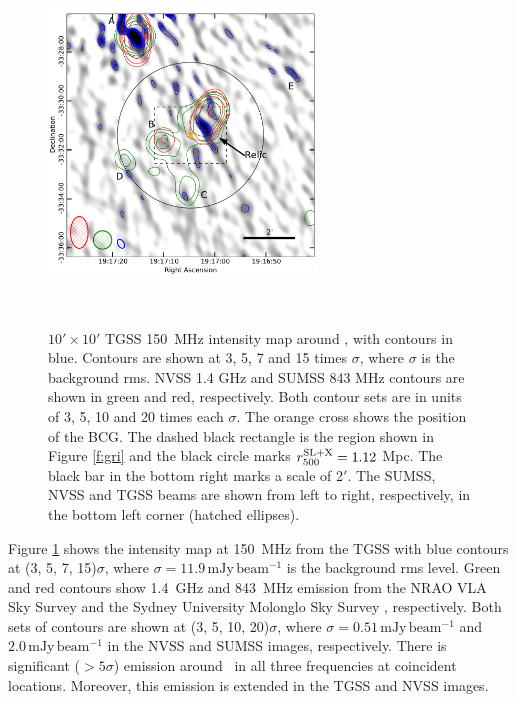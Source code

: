 \begin{figure}
 \begin{minipage}[b]{2.8in}
   \mbox{}\\[-\baselineskip]
  \includegraphics[width=2.8in]{chapter2/radioimg.pdf}
 \end{minipage}\hfill
 \begin{minipage}[b]{2in}
   \mbox{}\\[-\baselineskip]
   \caption{$10'\times10'$ TGSS 150~MHz intensity map around \plck, with contours in blue. 
Contours are shown at 3, 5, 7 and 15 times $\sigma$, where $\sigma$ is the background rms. NVSS 
1.4 GHz and SUMSS 843 MHz contours are shown in green and red, respectively. Both contour sets are 
in units of 3, 5, 10 and 20 times each $\sigma$. The orange cross shows the position of the 
BCG. The dashed black rectangle is the region shown in Figure \ref{f:gri} and the black circle 
marks $r_{500}^{\rm SL+X}=1.12$ Mpc. The black bar in the bottom right marks a scale of 2$'$. The
SUMSS, NVSS and TGSS beams are shown from left to right, respectively, in the bottom left corner 
(hatched ellipses).}
\label{f:radio}
 \end{minipage}
\end{figure}


Figure \ref{f:radio} shows the intensity map at 150~MHz from the TGSS with blue contours at
(3, 5, 7, 15)$\sigma$, where $\sigma=11.9\,\mathrm{mJy\,beam^{-1}}$ is the background 
rms level. Green and red contours show 1.4~GHz and 843~MHz emission from the NRAO VLA Sky Survey 
\citep[NVSS;][]{condon98} and the Sydney University Molonglo Sky Survey 
\citep[SUMSS;][]{mauch03}, 
respectively. Both sets of contours are shown at (3, 5, 10, 20)$\sigma$, where 
$\sigma=0.51\,\mathrm{mJy\,beam^{-1}}$ and $2.0\,\mathrm{mJy\,beam^{-1}}$ in the NVSS and SUMSS 
images, respectively. There is significant ($>5\sigma$) emission around \plck\ in all three 
frequencies at coincident locations. Moreover, this emission is extended in the TGSS and NVSS 
images.

